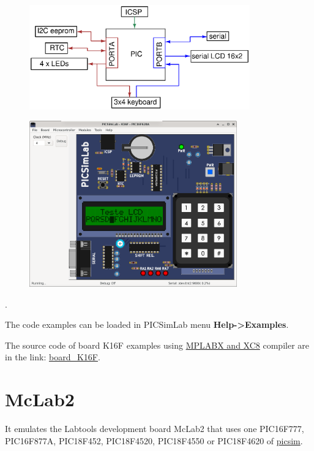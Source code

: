 \begin{figure}[H]
\center
\includegraphics[width=0.85\textwidth]{img/blocks_p2.eps} 
\end{figure} 


\begin{figure}[H]
\center
\includegraphics[width=0.8\textwidth]{img/picsimlab2.png} 
\end{figure} 

.\vspace{0.5cm}

The code examples can be loaded in PICSimLab menu \textbf{Help->Examples}.

The source code of board K16F examples using \href{http://www.microchip.com/mplabx}{MPLABX and XC8} compiler are in
the link: \href{https://lcgamboa.github.io/picsimlab_examples/examples/examples_index.html\#board_K16F}{board\_K16F}.


\section{McLab2}

It emulates the Labtools development board McLab2 that uses one PIC16F777, PIC16F877A, PIC18F452, PIC18F4520, PIC18F4550 or PIC18F4620 of \href{https://github.com/lcgamboa/picsim}{picsim}.

